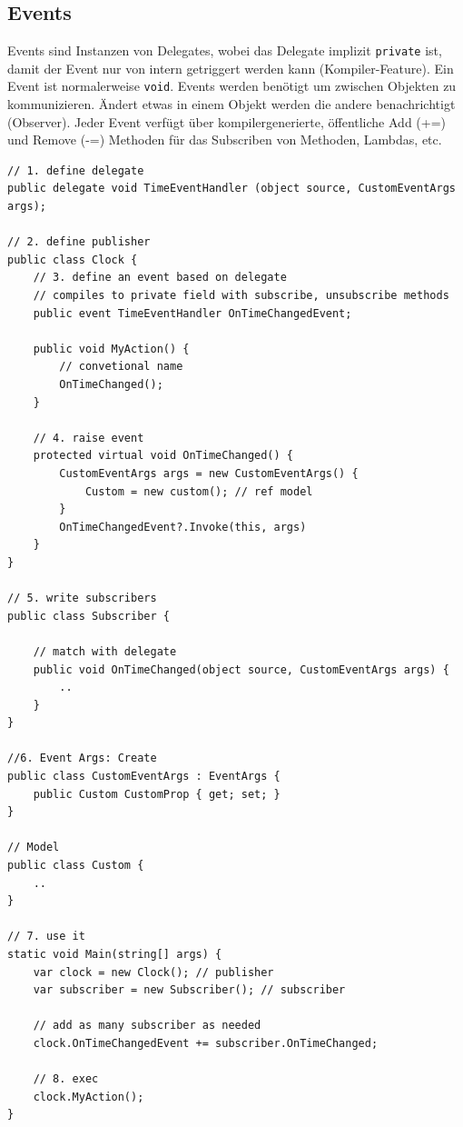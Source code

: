 \documentclass[
a4paper,
oneside,
10pt,
fleqn,
headsepline,
toc=listofnumbered, 
bibliography=totocnumbered]{scrartcl}
\begin{document}
\subsection{Events}
Events sind Instanzen von Delegates, wobei das Delegate  implizit \lstinline|private| ist, damit der Event nur von intern getriggert werden kann (Kompiler-Feature). Ein Event ist normalerweise \lstinline|void|. Events werden benötigt um zwischen Objekten zu kommunizieren. Ändert etwas in einem Objekt werden die andere benachrichtigt (Observer). Jeder Event verfügt über kompilergenerierte, öffentliche Add (+=) und Remove (-=) Methoden für das Subscriben von Methoden, Lambdas, etc.
\begin{lstlisting}
// 1. define delegate
public delegate void TimeEventHandler (object source, CustomEventArgs args);

// 2. define publisher
public class Clock {
	// 3. define an event based on delegate
	// compiles to private field with subscribe, unsubscribe methods
	public event TimeEventHandler OnTimeChangedEvent;
	
	public void MyAction() {
		// convetional name
		OnTimeChanged();
	}
	
	// 4. raise event
	protected virtual void OnTimeChanged() {
		CustomEventArgs args = new CustomEventArgs() {
			Custom = new custom(); // ref model
		}
		OnTimeChangedEvent?.Invoke(this, args)
	}
}

// 5. write subscribers
public class Subscriber {
	
	// match with delegate
	public void OnTimeChanged(object source, CustomEventArgs args) {
		.. 
	}
}

//6. Event Args: Create 
public class CustomEventArgs : EventArgs {
	public Custom CustomProp { get; set; }
}

// Model
public class Custom {
	..
}

// 7. use it
static void Main(string[] args) {
	var clock = new Clock(); // publisher
	var subscriber = new Subscriber(); // subscriber
	
	// add as many subscriber as needed
	clock.OnTimeChangedEvent += subscriber.OnTimeChanged;
	
	// 8. exec
	clock.MyAction();
}
\end{lstlisting}
\end{document}
